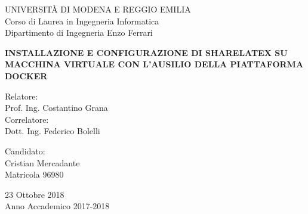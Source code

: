 \thispagestyle{empty}
\vspace*{-1. cm} \bfseries{
\begin{center}
  \Large
  UNIVERSIT\`A DI MODENA E REGGIO EMILIA\\
  
  \vspace{0.25 cm}
  \large
  Corso di Laurea in Ingegneria Informatica\\
  Dipartimento di Ingegneria Enzo Ferrari\\
  \vspace*{5. cm} \LARGE

  \textbf{INSTALLAZIONE E CONFIGURAZIONE DI SHARELATEX SU MACCHINA VIRTUALE CON L'AUSILIO DELLA PIATTAFORMA DOCKER}\\
  
\end{center}
\vspace*{3.25 cm} \large
\begin{flushleft}


  Relatore:\\Prof. Ing. Costantino Grana\\
  \vspace*{0.25 cm}
  Correlatore:\\Dott. Ing. Federico Bolelli 

\end{flushleft}
\vspace*{1.5 cm}
\begin{flushright}


  Candidato:\\ Cristian Mercadante\\
  Matricola 96980


\end{flushright}
\vspace*{2.25 cm}
\begin{center}


  23 Ottobre 2018\\
  Anno Accademico 2017-2018
\end{center} \clearpage
}
